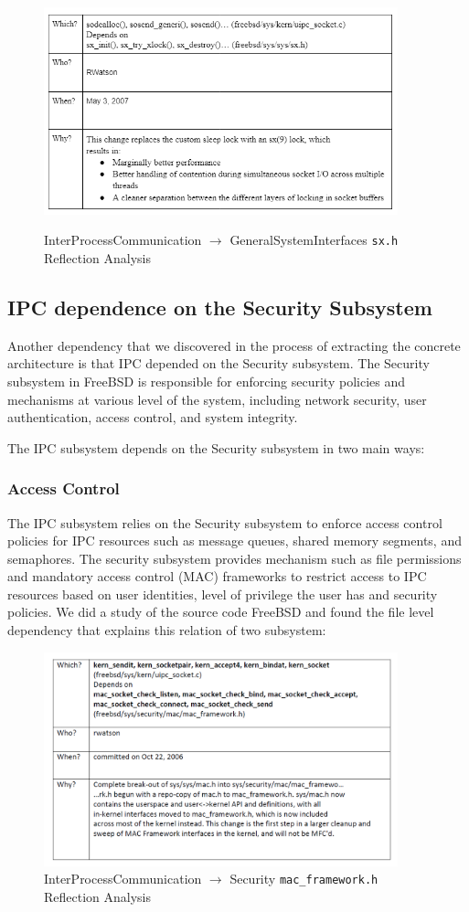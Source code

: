 \documentclass[12pt, dvipsnames, a4paper]{article}
\newcommand{\code}[1]{\texttt{#1}}
\begin{document}
\begin{figure}[!htb]
	\centering
	\includegraphics[width=290pt]{assets/IPC_Sx.png}
	\caption{InterProcessCommunication $\longrightarrow$ GeneralSystemInterfaces \code{sx.h} Reflection Analysis}\cite{sx}
\end{figure}

\subsection{IPC dependence on the Security Subsystem}
Another dependency that we discovered in the process of extracting the concrete architecture is that IPC depended on the Security subsystem. The Security subsystem in FreeBSD is responsible for enforcing security policies and mechanisms at various level of the system, including network security, user authentication, access control, and system integrity.

The IPC subsystem depends on the Security subsystem in two main ways:

\subsubsection{Access Control}
The IPC subsystem relies on the Security subsystem to enforce access control policies for IPC resources such as message queues, shared memory segments, and semaphores. The security subsystem provides mechanism such as file permissions and mandatory access control (MAC) frameworks to restrict access to IPC resources based on user identities, level of privilege the user has and security policies. We did a study of the source code FreeBSD and found the file level dependency that explains this relation of two subsystem:

\begin{figure}[!htb]
	\centering
	\includegraphics[width=290pt]{assets/4Ws_2.png}
	\caption{InterProcessCommunication $\longrightarrow$ Security \code{mac\_framework.h} Reflection Analysis}
\end{figure}
\end{document}
